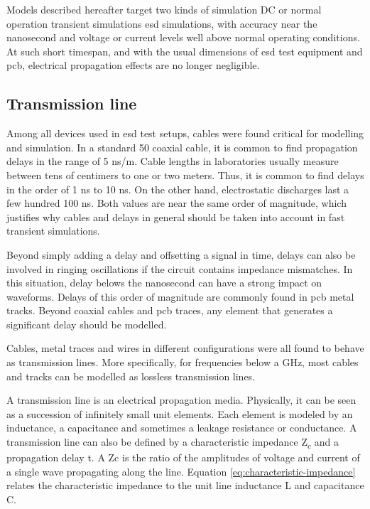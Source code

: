 Models described hereafter target two kinds of simulation
DC or normal operation transient simulations
\gls{esd} simulations, with accuracy near the nanosecond and voltage or current levels well above normal operating conditions.
At such short timespan, and with the usual dimensions of \gls{esd} test equipment and \gls{pcb}, electrical propagation effects are no longer negligible.


\subsection{Transmission line}

Among all devices used in \gls{esd} test setups, cables were found critical for modelling and simulation.
In a standard 50\textOmega{} coaxial cable, it is common to find propagation delays in the range of 5 ns/m.
Cable lengths in laboratories usually measure between tens of centimers to one or two meters.
Thus, it is common to find delays in the order of 1 ns to 10 ns.
On the other hand, electrostatic discharges last a few hundred 100 ns.
Both values are near the same order of magnitude, which justifies why cables and delays in general should be taken into account in fast transient simulations.

Beyond simply adding a delay and offsetting a signal in time, delays can also be involved in ringing oscillations if the circuit contains impedance mismatches.
In this situation, delay belows the nanosecond can have a strong impact on waveforms.
Delays of this order of magnitude are commonly found in \gls{pcb} metal tracks.
Beyond coaxial cables and \gls{pcb} traces, any element that generates a significant delay should be modelled.

Cables, metal traces and wires in different configurations were all found to behave as transmission lines.
More specifically, for frequencies below a GHz, most cables and tracks can be modelled as lossless transmission lines.

A transmission line is an electrical propagation media.
Physically, it can be seen as a succession of infinitely small unit elements.
Each element is modeled by an inductance, a capacitance and sometimes a leakage resistance or conductance.
A transmission line can also be defined by a characteristic impedance Z\textsubscript{c} and a propagation delay \textDelta{}t.
A \gls{Zc} is the ratio of the amplitudes of voltage and current of a single wave propagating along the line.
Equation \ref{eq:characteristic-impedance} relates the characteristic impedance to the unit line inductance \textdelta{}L and capacitance \textdelta{}C.

